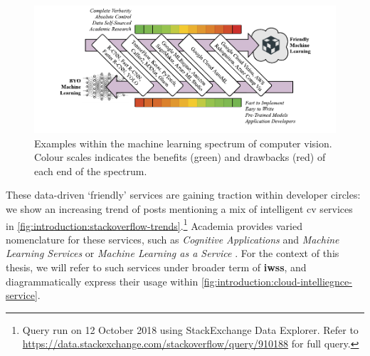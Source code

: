 \begin{figure}
\centering
\caption[The spectrum of machine learning]{Examples within the machine learning spectrum of computer vision. Colour scales indicates the benefits (green) and drawbacks (red) of each end of the spectrum.}
\label{fig:introduction:cv-spectrum}
\includegraphics[width=\linewidth]{cv-spectrum}
\end{figure}



These data-driven `friendly' services are gaining traction within developer circles: we show an increasing trend of  posts mentioning a mix of intelligent \gls{cv} services in \cref{fig:introduction:stackoverflow-trends}.\footnote{Query run on 12 October 2018 using StackExchange Data Explorer. Refer to \url{https://data.stackexchange.com/stackoverflow/query/910188} for full query.}
Academia provides varied nomenclature for these services, such as \textit{Cognitive Applications} and \textit{Machine Learning Services} \citep{Hwang:2017tr} or \textit{Machine Learning as a Service} \citep{Ribeiro:2015dz}. 
For the context of this thesis, we will refer to such services under broader term of \textbf{\glspl{iws}}, and diagrammatically express their usage within \cref{fig:introduction:cloud-intelliegnce-service}.

